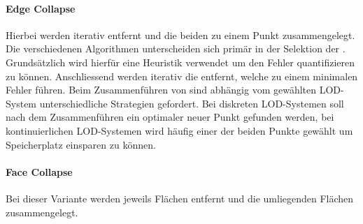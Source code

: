 \paragraph{Edge Collapse}
Hierbei werden iterativ  entfernt und die beiden  zu einem Punkt zusammengelegt.
Die verschiedenen Algorithmen unterscheiden sich primär in der Selektion der . Grundsätzlich wird hierfür eine Heuristik verwendet um den Fehler quantifizieren zu können. Anschliessend werden iterativ die  entfernt, welche zu einem minimalen Fehler führen. Beim Zusammenführen von  sind abhängig vom gewählten LOD-System unterschiedliche Strategien gefordert. Bei diskreten LOD-Systemen soll nach dem Zusammenführen ein optimaler neuer Punkt gefunden werden, bei kontinuierlichen LOD-Systemen wird häufig einer der beiden Punkte gewählt um Speicherplatz einsparen zu können.

\paragraph{Face Collapse}
Bei dieser Variante werden jeweils Flächen entfernt und die umliegenden Flächen zusammengelegt.
